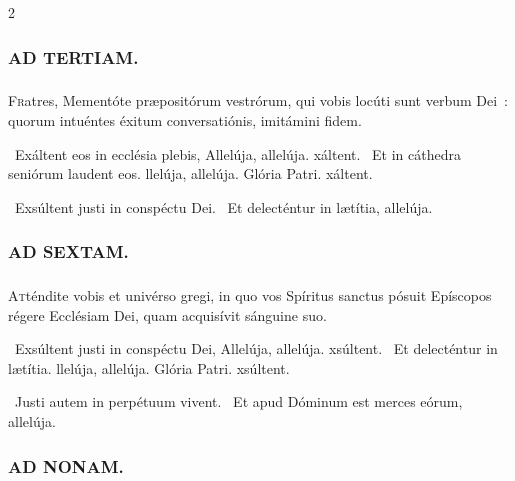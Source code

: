 \documentclass[9pt,twoside]{extarticle}
\begin{document}
\begin{multicols}{2}
{{\begin{tightlist}{}
\item {}
\end{tightlist}

\subsubsection*{\center \textsc{AD TERTIAM.}}
\subsubsection*{}
\lettrine{F}ratres, Mementóte præpositórum vestrórum, qui vobis locúti sunt verbum Dei~: quorum intuéntes éxitum conversatiónis, imitámini fidem.

\begin{tightlist}{}
\item {}~Exáltent eos in ecclésia plebis, \textred{*} Allelúja, allelúja. xáltent. ~Et in cáthedra seniórum laudent eos. llelúja, allelúja. Glória Patri. xáltent.
\item {}~Exsúltent justi in conspéctu Dei. ~Et delecténtur in lætítia, allelúja.
\end{tightlist}

\subsubsection*{\center \textsc{AD SEXTAM.}}
\subsubsection*{}
\lettrine{A}tténdite vobis et univérso gregi, in quo vos Spíritus sanctus pósuit Epíscopos régere Ecclésiam Dei, quam acquisívit sánguine suo.

\begin{tightlist}{}
\item {}~Exsúltent justi in conspéctu Dei, \textred{*} Allelúja, allelúja. xsúltent. ~Et delecténtur in lætítia. llelúja, allelúja. Glória Patri. xsúltent.
\item {}~Justi autem in perpétuum vivent. ~Et apud Dóminum est merces eórum, allelúja.
\end{tightlist}

\subsubsection*{\center \textsc{AD NONAM.}}
}}
\end{multicols}
\end{document}
